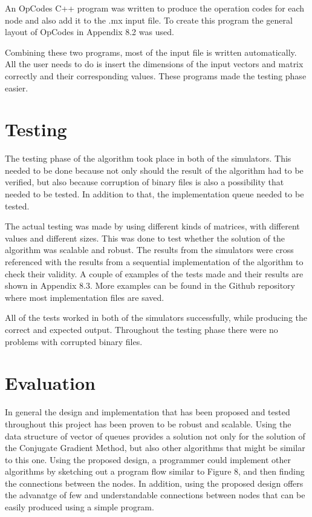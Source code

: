 \documentclass[12pt,a4paper]{article}
\begin{document}
An OpCodes C++ program was written to produce  the operation codes for each node and also add it to the .mx input file. To create this program the general layout of OpCodes in Appendix 8.2 was used.

Combining these two programs, most of the input file is written automatically. All the user needs to do is insert the dimensions of the input vectors and matrix correctly and their corresponding values. These programs made the testing phase easier.
\section{Testing}
The testing phase of the algorithm took place in both of the simulators. This needed to be done because not only should the result of the algorithm had to be verified, but also because corruption of binary files is also a possibility that needed to be tested. In addition to that, the implementation queue needed to be tested.

The actual testing was made by using different kinds of matrices, with different values and different sizes. This was done to test whether the solution of the algorithm was scalable and robust. The results from the simulators were cross referenced with the results from a sequential implementation of the algorithm to check their validity. A couple of examples of the tests made and their results are shown in Appendix 8.3. More examples can be found in the Github repository where most implementation files are saved\cite{git_repo}.

All of the tests worked in both of the simulators successfully, while producing the correct and expected output. Throughout the testing phase there were no problems with corrupted binary files.
\section{Evaluation}
In general the design and implementation that has been proposed and tested throughout this project has been proven to be robust and scalable. Using the data structure of vector of queues provides a solution not only for the solution of the Conjugate Gradient Method, but also other algorithms that might be similar to this one. Using the proposed design, a programmer could implement other algorithms by sketching out a program flow similar to Figure 8, and then finding the connections between the nodes. In addition, using the proposed design offers the advanatge of few and understandable connections between nodes that can be easily produced using a simple program.
\end{document}
